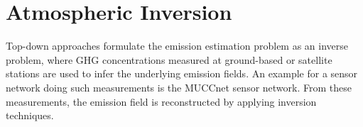 



\section{Atmospheric Inversion}
Top-down approaches formulate the emission estimation problem as an inverse problem, where GHG concentrations measured at ground-based or satellite stations are used to infer the underlying emission fields.
An example for a sensor network doing such measurements is the MUCCnet sensor network.
From these measurements, the emission field is reconstructed by applying inversion techniques. 


